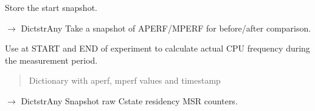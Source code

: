 \documentclass[letterpaper,10pt,english]{sphinxmanual}
\begin{document}
\begin{fulllineitems}
\begin{fulllineitems}
\label{\detokenize{core.readers.msr_reader:core.readers.msr_reader.MSRReader.set_start_snapshot}}
\pysigstartsignatures
\pysiglinewithargsret
{}
{}
{}
\pysigstopsignatures
\sphinxAtStartPar
Store the start snapshot.

\end{fulllineitems}


\begin{fulllineitems}
\label{\detokenize{core.readers.msr_reader:core.readers.msr_reader.MSRReader.snapshot_aperf_mperf}}
\pysigstartsignatures
\pysiglinewithargsret
{}
{\sphinxparamcomma {}}
{{ $\rightarrow$ Dict\DUrole{p}{{[}}strAny\DUrole{p}{{]}}}}
\pysigstopsignatures
\sphinxAtStartPar
Take a snapshot of APERF/MPERF for before/after comparison.

\sphinxAtStartPar
Use at START and END of experiment to calculate actual CPU frequency
during the measurement period.
\begin{quote}\begin{description}
\sphinxAtStartPar
Dictionary with aperf, mperf values and timestamp

\end{description}\end{quote}

\end{fulllineitems}


\begin{fulllineitems}
\label{\detokenize{core.readers.msr_reader:core.readers.msr_reader.MSRReader.snapshot_cstate_counters}}
\pysigstartsignatures
\pysiglinewithargsret
{}
{\sphinxparamcomma {}}
{{ $\rightarrow$ Dict\DUrole{p}{{[}}strAny\DUrole{p}{{]}}}}
\pysigstopsignatures
\sphinxAtStartPar
Snapshot raw C\sphinxhyphen{}state residency MSR counters.


\end{fulllineitems}
\end{fulllineitems}
\end{document}
